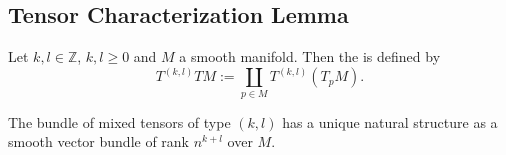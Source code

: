 \begin{appendix}
\section{Tensor Characterization Lemma}
\begin{definition}
Let $k,l \in \mathbb{Z}$, $k,l \geq 0$ and $M$ a smooth manifold. Then the  is defined by
\begin{equation}
T^{(k,l)}TM := \coprod_{p \in M} T^{(k,l)}(T_pM).
\end{equation}
\end{definition}

\begin{proposition}
The bundle of mixed tensors of type $(k,l)$ has a unique natural structure as a smooth vector bundle of rank $n^{k + l}$ over $M$.
\label{prop:smooth_bundle}
\end{proposition}


\end{appendix}
